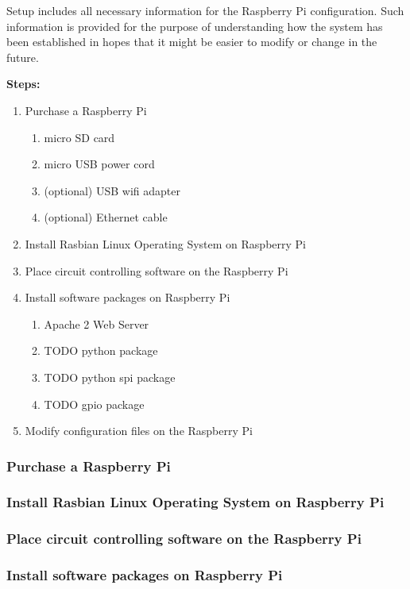 \documentclass{article}	%
\begin{document}
\begin{multicols}{2}
Setup includes all necessary information
for the Raspberry Pi configuration.
Such information is provided
for the purpose of understanding 
how the system has been established
in hopes that it might be easier to modify or
change in the future.

\textbf{Steps:}
\begin{enumerate}
\item Purchase a Raspberry Pi
    \begin{enumerate}
    \item micro SD card
    \item micro USB power cord
    \item (optional) USB wifi adapter
    \item (optional) Ethernet cable
    \end{enumerate}
\item Install Rasbian Linux Operating System on Raspberry Pi
\item Place circuit controlling software on the Raspberry Pi
\item Install software packages on Raspberry Pi
    \begin{enumerate}
    \item Apache 2 Web Server
    \item TODO python package
    \item TODO python spi package
    \item TODO gpio package
    \end{enumerate}
\item Modify configuration files on the Raspberry Pi
\end{enumerate}

\subsubsection{Purchase a Raspberry Pi}

\subsubsection{Install Rasbian Linux Operating System on Raspberry Pi}

\subsubsection{Place circuit controlling software on the Raspberry Pi}

\subsubsection{Install software packages on Raspberry Pi}


\end{multicols}
\end{document}
